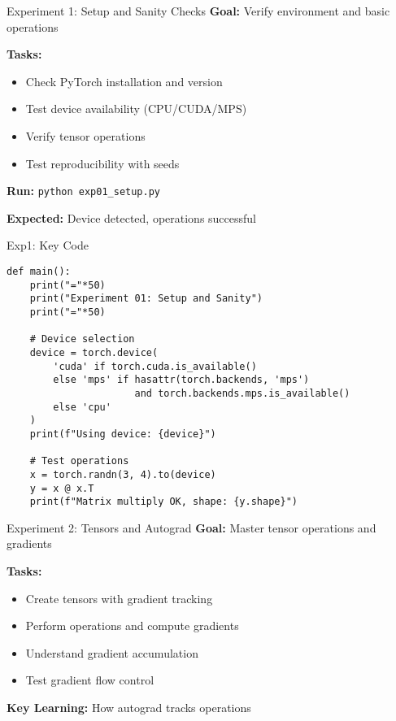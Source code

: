 \documentclass[aspectratio=169,10pt]{beamer}
\begin{document}
\begin{frame}{Experiment 1: Setup and Sanity Checks}
\textbf{Goal:} Verify environment and basic operations

\textbf{Tasks:}
\begin{itemize}
    \item Check PyTorch installation and version
    \item Test device availability (CPU/CUDA/MPS)
    \item Verify tensor operations
    \item Test reproducibility with seeds
\end{itemize}

\textbf{Run:} \texttt{python exp01\_setup.py}

\textbf{Expected:} Device detected, operations successful
\end{frame}

\begin{frame}[fragile]{Exp1: Key Code}
\begin{lstlisting}
def main():
    print("="*50)
    print("Experiment 01: Setup and Sanity")
    print("="*50)
    
    # Device selection
    device = torch.device(
        'cuda' if torch.cuda.is_available() 
        else 'mps' if hasattr(torch.backends, 'mps') 
                      and torch.backends.mps.is_available()
        else 'cpu'
    )
    print(f"Using device: {device}")
    
    # Test operations
    x = torch.randn(3, 4).to(device)
    y = x @ x.T
    print(f"Matrix multiply OK, shape: {y.shape}")
\end{lstlisting}
\end{frame}

\begin{frame}{Experiment 2: Tensors and Autograd}
\textbf{Goal:} Master tensor operations and gradients

\textbf{Tasks:}
\begin{itemize}
    \item Create tensors with gradient tracking
    \item Perform operations and compute gradients
    \item Understand gradient accumulation
    \item Test gradient flow control
\end{itemize}

\textbf{Key Learning:} How autograd tracks operations
\end{frame}
\end{document}
